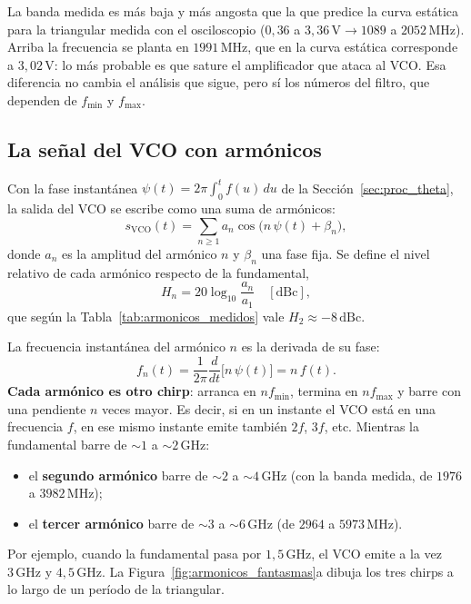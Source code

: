 \documentclass[12pt, a4paper, twoside]{report}
\begin{document}
La banda medida es más baja y más angosta que la que predice la curva
estática para la triangular medida con el osciloscopio ($0{,}36$ a
$3{,}36\,\text{V} \to 1089$ a $2052\,\text{MHz}$). Arriba la frecuencia se
planta en $1991\,\text{MHz}$, que en la curva estática corresponde a
$3{,}02\,\text{V}$: lo más probable es que sature el amplificador que ataca
al VCO. Esa diferencia no cambia el análisis que sigue, pero sí los números
del filtro, que dependen de $f_\text{min}$ y $f_\text{max}$.

\subsection{La señal del VCO con armónicos}
\label{sub:armonicos_modelo}

Con la fase instantánea $\psi(t) = 2\pi\int_0^t f(u)\,du$ de la
Sección~\ref{sec:proc_theta}, la salida del VCO se escribe como una suma de
armónicos:
\begin{equation}
  s_\text{VCO}(t) = \sum_{n\geq 1} a_n \cos\!\bigl(n\,\psi(t) + \beta_n\bigr),
  \label{eq:vco_armonicos}
\end{equation}
donde $a_n$ es la amplitud del armónico $n$ y $\beta_n$ una fase fija. Se
define el nivel relativo de cada armónico respecto de la fundamental,
\begin{equation}
  H_n = 20\log_{10}\frac{a_n}{a_1}\quad[\text{dBc}],
\end{equation}
que según la Tabla~\ref{tab:armonicos_medidos} vale $H_2 \approx
-8\,\text{dBc}$.

La frecuencia instantánea del armónico $n$ es la derivada de su fase:
\begin{equation}
  f_n(t) = \frac{1}{2\pi}\frac{d}{dt}\bigl[n\,\psi(t)\bigr] = n\,f(t).
\end{equation}
\textbf{Cada armónico es otro chirp}: arranca en $n f_\text{min}$, termina en
$n f_\text{max}$ y barre con una pendiente $n$ veces mayor. Es decir, si en
un instante el VCO está en una frecuencia $f$, en ese mismo instante emite
también $2f$, $3f$, etc. Mientras la fundamental barre de $\sim\!1$ a
$\sim\!2\,\text{GHz}$:
\begin{itemize}
  \item el \textbf{segundo armónico} barre de $\sim\!2$ a
    $\sim\!4\,\text{GHz}$ (con la banda medida, de $1976$ a
    $3982\,\text{MHz}$);
  \item el \textbf{tercer armónico} barre de $\sim\!3$ a
    $\sim\!6\,\text{GHz}$ (de $2964$ a $5973\,\text{MHz}$).
\end{itemize}
Por ejemplo, cuando la fundamental pasa por $1{,}5\,\text{GHz}$, el VCO
emite a la vez $3\,\text{GHz}$ y $4{,}5\,\text{GHz}$. La
Figura~\ref{fig:armonicos_fantasmas}a dibuja los tres chirps a lo largo de un
período de la triangular.
\end{document}
